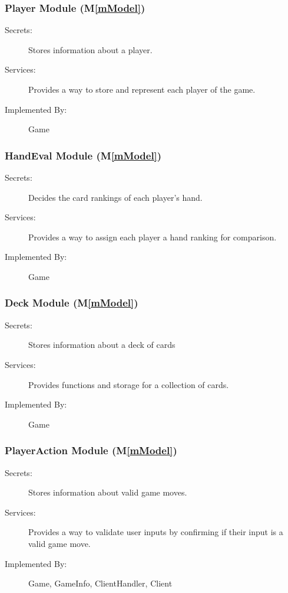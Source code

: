 \documentclass[12pt, titlepage]{article}
\newcommand{\mref}[1]{M\ref{#1}}
\begin{document}
\subsubsection{ Player Module (\mref{mModel})}
    \begin{description}
    \item[Secrets:] Stores information about a player.
    \item[Services:] Provides a way to store and represent each player of the game.
    \item[Implemented By:] Game
    \end{description}

\subsubsection{ HandEval Module (\mref{mModel})}
    \begin{description}
    \item[Secrets:] Decides the card rankings of each player's hand.
    \item[Services:] Provides a way to assign each player a hand ranking for comparison.
    \item[Implemented By:] Game
    \end{description}

\subsubsection{ Deck Module (\mref{mModel})}
    \begin{description}
    \item[Secrets:] Stores information about a deck of cards
    \item[Services:] Provides functions and storage for a collection of cards.
    \item[Implemented By:] Game
    \end{description}
    
\subsubsection{ PlayerAction Module (\mref{mModel})}
    \begin{description}
    \item[Secrets:] Stores information about valid game moves.
    \item[Services:] Provides a way to validate user inputs by confirming if their input is a valid game move.
    \item[Implemented By:] Game, GameInfo, ClientHandler, Client
    \end{description}
\end{document}
